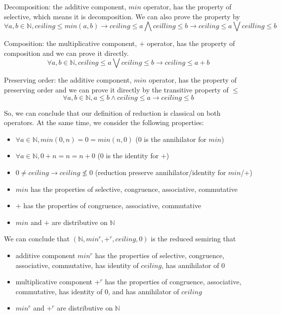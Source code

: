 \documentclass[a4paper,12pt,twoside,openright]{report}
\begin{document}
Decomposition: the additive component, $min$ operator, has the property of selective, which means it is decomposition. We can also prove the property by \[\forall a, b\in \mathbb{N}, ceiling \leq min(a,b) \rightarrow ceiling \leq a \bigwedge ceilling \leq b \rightarrow ceiling \leq a \bigvee ceilling \leq b\]

Composition: the multiplicative component, $+$ operator, has the property of composition and we can prove it directly. \[\forall a,b \in \mathbb{N}, ceiling \leq a \bigvee ceiling \leq b \rightarrow ceiling \leq a + b\]

Preserving order: the additive component, $min$ operator, has the property of preserving order and we can prove it directly by the transitive property of $\leq$
\[\forall a,b \in \mathbb{N}, a \leq b \wedge ceiling \leq a \rightarrow ceiling \leq b\]

So, we can conclude that our definition of reduction is classical on both operators. At the same time, we consider the following properties:
\begin{itemize}
  \item $\forall a \in \mathbb{N}, min(0,n) = 0 = min(n,0)$ (0 is the annihilator for $min$)
  \item $\forall a \in \mathbb{N}, 0 + n = n = n + 0$ (0 is the identity for $+$)
  \item $ 0 \neq ceiling \rightarrow ceiling \not\leq 0$ (reduction preserve annihilator/identity for $min$/$+$)
  \item $min$ has the properties of selective, congruence, associative, commutative
  \item $+$ has the properties of congruence, associative, commutative
  \item $min$ and $+$ are distributive on $\mathbb{N}$
\end{itemize}
We can conclude that $(\mathbb{N},min^r,+^r,ceiling,0)$ is the reduced semiring that 
\begin{itemize}
  \item additive component $min^r$ has the properties of selective, congruence, associative, commutative, has identity of $ceiling$, has annihilator of 0
  \item multiplicative component $+^r$ has the properties of congruence, associative, commutative, has identity of 0, and has annihilator of $ceiling$
  \item $min^r$ and $+^r$ are distributive on $\mathbb{N}$
\end{itemize}
 
\end{document}
